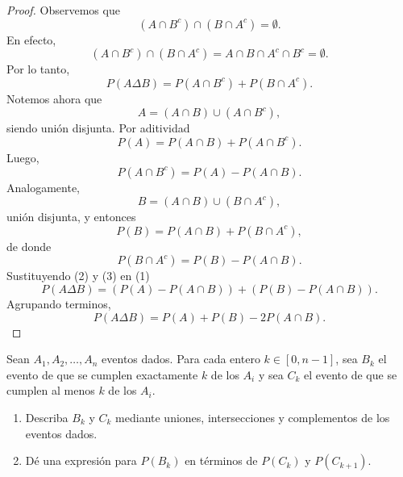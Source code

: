 \documentclass[12pt,a4paper]{article}
\begin{document}
    \begin{proof}
        Observemos que
        \begin{equation*}
            (A\cap B^{c})\cap(B\cap A^{c})=\emptyset.
        \end{equation*}
        En efecto,
        \begin{equation*}
            (A\cap B^{c})\cap(B\cap A^{c})=A\cap B\cap A^{c}\cap B^{c}=\emptyset.
        \end{equation*}
        Por lo tanto,
        \begin{equation}
            P(A\Delta B)=P(A\cap B^{c})+P(B\cap A^{c}).
        \end{equation}
        Notemos ahora que
        \begin{equation*}
            A=(A\cap B)\cup(A\cap B^{c}),
        \end{equation*}
        siendo unión disjunta. Por aditividad
        \begin{equation*}
            P(A)=P(A\cap B)+P(A\cap B^{c}).
        \end{equation*}
        Luego,
        \begin{equation}
            P(A\cap B^{c})=P(A)-P(A\cap B).
        \end{equation}
        Analogamente,
        \begin{equation*}
            B=(A\cap B)\cup(B\cap A^{c}),
        \end{equation*}
        unión disjunta, y entonces
        \begin{equation*}
            P(B)=P(A\cap B)+P(B\cap A^{c}),
        \end{equation*}
        de donde
        \begin{equation}
            P(B\cap A^{c})=P(B)-P(A\cap B).
        \end{equation}
        Sustituyendo (2) y (3) en (1)
        \begin{equation*}
            P(A\Delta B)=(P(A)-P(A\cap B))+(P(B)-P(A\cap B)).
        \end{equation*}
        Agrupando terminos,
        \begin{equation*}
            P(A \Delta B) = P(A) + P(B) - 2P(A \cap B).
        \end{equation*}
    \end{proof}

    \begin{mdframed}[style=mdbluebox,frametitle={Ejercicio 3}]
        Sean $A_1, A_2, \dots, A_n$ eventos dados. Para cada entero $k \in [0,n-1]$, sea $B_k$ el evento de que se cumplen exactamente $k$ de los $A_i$ y sea $C_k$ el evento de que se cumplen al menos $k$ de los $A_i$.
        \begin{enumerate}
            \item[(a)] Describa $B_k$ y $C_k$ mediante uniones, intersecciones y complementos de los eventos dados.
            \item[(b)] Dé una expresión para $P(B_k)$ en términos de $P(C_k)$ y $P(C_{k+1})$.
        \end{enumerate}
    \end{mdframed}
\end{document}

